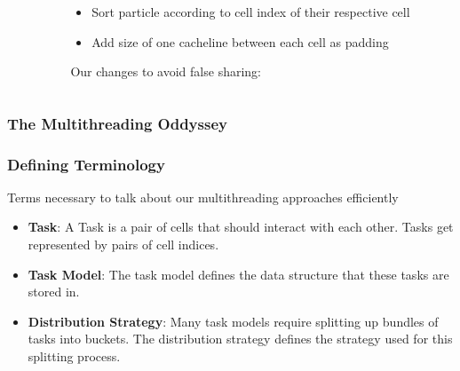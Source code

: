 \begin{frame}
\begin{columns}
\begin{column}{0.5\textwidth}
\end{column}

\begin{column}{0.5\textwidth}
	\vspace{-4cm}
	
	\begin{itemize}
		\item<2-> Sort particle according to cell index of their respective cell
		\item<2-> Add size of one cacheline between each cell as padding
	\end{itemize}

	\vspace{-4cm}
	Our changes to avoid false sharing:
\end{column}
\end{columns}
\end{frame}

\begin{frame}
	\frametitle{The Multithreading Oddyssey}
	\PraesentationBildUhrenturm
\end{frame}

\begin{frame}
	\frametitle{Defining Terminology}
	\large
	Terms necessary to talk about our multithreading approaches efficiently
	\begin{itemize}
		\setlength\itemsep{1em}
		\item<1-> \textbf{Task}: A Task is a pair of cells that should interact with each other. Tasks get represented by pairs of cell indices.
		\item<2-> \textbf{Task Model}: The task model defines the data structure that these tasks are stored in.
		\item<3-> \textbf{Distribution Strategy}: Many task models require splitting up bundles of tasks into buckets. The distribution strategy defines the strategy used for this splitting process.
	\end{itemize}
\end{frame}


